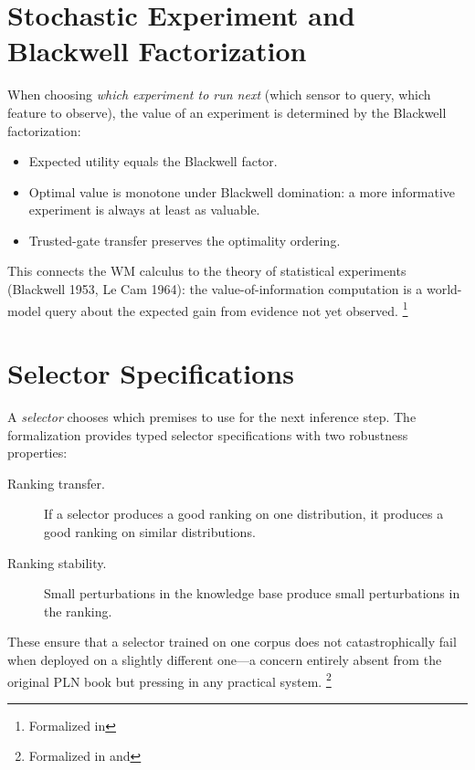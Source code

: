 \documentclass[11pt,openany]{report}
\begin{document}
\section{Stochastic Experiment and Blackwell Factorization}

When choosing \emph{which experiment to run next} (which sensor to
query, which feature to observe), the value of an experiment is
determined by the Blackwell factorization:

\begin{itemize}
\item Expected utility equals the Blackwell factor.
\item Optimal value is monotone under Blackwell domination: a more
  informative experiment is always at least as valuable.
\item Trusted-gate transfer preserves the optimality ordering.
\end{itemize}

\noindent
This connects the WM calculus to the theory of statistical
experiments (Blackwell 1953, Le Cam 1964): the value-of-information
computation is a world-model query about the expected gain from
evidence not yet observed.%
\footnote{Formalized in
}



\section{Selector Specifications}
\label{sec:selectors}

A \emph{selector} chooses which premises to use for the next
inference step.  The formalization provides typed selector
specifications with two robustness properties:

\begin{description}
\item[Ranking transfer.] If a selector produces a good ranking on
  one distribution, it produces a good ranking on similar
  distributions.
\item[Ranking stability.] Small perturbations in the knowledge base
  produce small perturbations in the ranking.
\end{description}

\noindent
These ensure that a selector trained on one corpus does not
catastrophically fail when deployed on a slightly different one---a
concern entirely absent from the original PLN book but pressing in
any practical system.%
\footnote{Formalized in
 and
}
\end{document}
